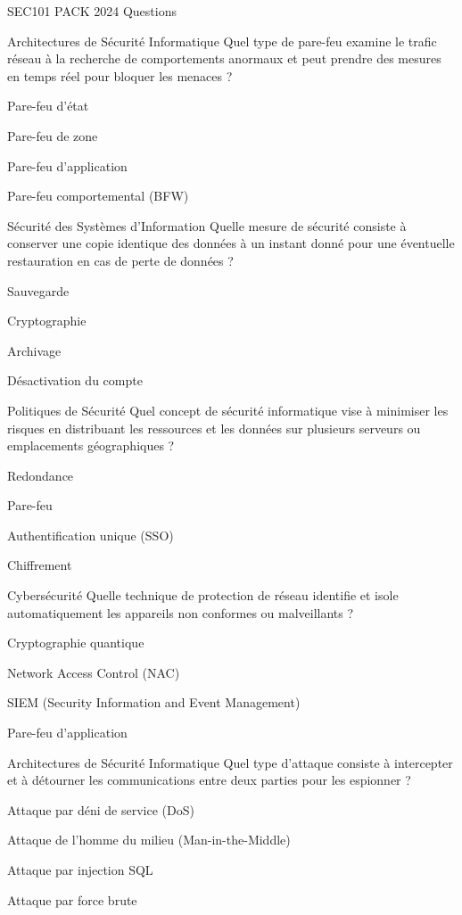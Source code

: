 \documentclass[12pt]{article}
\begin{document}
\begin{quiz}{SEC101 PACK 2024 Questions}
  \begin{multi}[points=1]{Architectures de Sécurité Informatique}
    Quel type de pare-feu examine le trafic réseau à la recherche de comportements anormaux et peut prendre des mesures en temps réel pour bloquer les menaces ?
    \item Pare-feu d'état
    \item Pare-feu de zone
    \item Pare-feu d'application
    \item* Pare-feu comportemental (BFW)
  \end{multi}

  \begin{multi}[points=1]{Sécurité des Systèmes d'Information}
    Quelle mesure de sécurité consiste à conserver une copie identique des données à un instant donné pour une éventuelle restauration en cas de perte de données ?
    \item* Sauvegarde
    \item Cryptographie
    \item Archivage
    \item Désactivation du compte
  \end{multi}

  \begin{multi}[points=1]{Politiques de Sécurité}
    Quel concept de sécurité informatique vise à minimiser les risques en distribuant les ressources et les données sur plusieurs serveurs ou emplacements géographiques ?
    \item* Redondance
    \item Pare-feu
    \item Authentification unique (SSO)
    \item Chiffrement
  \end{multi}

  \begin{multi}[points=1]{Cybersécurité}
    Quelle technique de protection de réseau identifie et isole automatiquement les appareils non conformes ou malveillants ?
    \item Cryptographie quantique
    \item* Network Access Control (NAC)
    \item SIEM (Security Information and Event Management)
    \item Pare-feu d'application
  \end{multi}

  \begin{multi}[points=1]{Architectures de Sécurité Informatique}
    Quel type d'attaque consiste à intercepter et à détourner les communications entre deux parties pour les espionner ?
    \item Attaque par déni de service (DoS)
    \item* Attaque de l'homme du milieu (Man-in-the-Middle)
    \item Attaque par injection SQL
    \item Attaque par force brute
  \end{multi}


\end{quiz}
\end{document}
